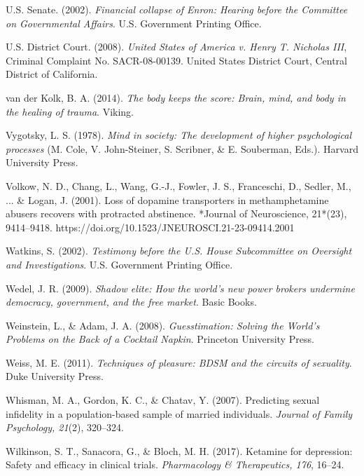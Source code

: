 \begin{thebibliography}{}

    U.S. Senate. (2002). \textit{Financial collapse of Enron: Hearing before the Committee on Governmental Affairs}. U.S. Government Printing Office.

    U.S. District Court. (2008). \textit{United States of America v. Henry T. Nicholas III}, Criminal Complaint No. SACR-08-00139. United States District Court, Central District of California.


    van der Kolk, B. A. (2014). \textit{The body keeps the score: Brain, mind, and body in the healing of trauma}. Viking.

    Vygotsky, L. S. (1978). \textit{Mind in society: The development of higher psychological processes} (M. Cole, V. John-Steiner, S. Scribner, \& E. Souberman, Eds.). Harvard University Press.

    Volkow, N. D., Chang, L., Wang, G.-J., Fowler, J. S., Franceschi, D., Sedler, M., ... \& Logan, J. (2001). Loss of dopamine transporters in methamphetamine abusers recovers with protracted abstinence. *Journal of Neuroscience, 21*(23), 9414–9418. https://doi.org/10.1523/JNEUROSCI.21-23-09414.2001

    
    Watkins, S. (2002). \textit{Testimony before the U.S. House Subcommittee on Oversight and Investigations}. U.S. Government Printing Office.

    Wedel, J. R. (2009). \textit{Shadow elite: How the world's new power brokers undermine democracy, government, and the free market}. Basic Books.

    Weinstein, L., \& Adam, J. A. (2008). \textit{Guesstimation: Solving the World's Problems on the Back of a Cocktail Napkin}. Princeton University Press.

    Weiss, M. E. (2011). \textit{Techniques of pleasure: BDSM and the circuits of sexuality}. Duke University Press.

    Whisman, M. A., Gordon, K. C., \& Chatav, Y. (2007). Predicting sexual infidelity in a population-based sample of married individuals. \textit{Journal of Family Psychology, 21}(2), 320–324.

    Wilkinson, S. T., Sanacora, G., \& Bloch, M. H. (2017). Ketamine for depression: Safety and efficacy in clinical trials. \textit{Pharmacology \& Therapeutics, 176}, 16–24.


\end{thebibliography}
